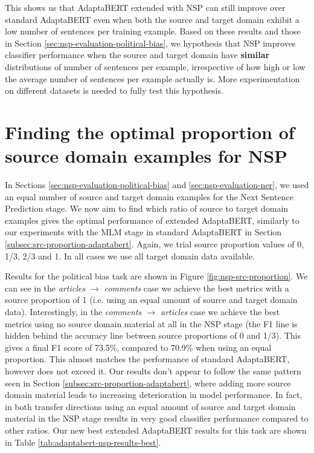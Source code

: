 This shows us that AdaptaBERT extended with NSP can still improve over standard AdaptaBERT even when both the source and target domain exhibit a low number of sentences per training example. Based on these results and those in Section \ref{sec:nsp-evaluation-political-bias}, we hypothesis that NSP improves classifier performance when the source and target domain have \textbf{similar} distributions of number of sentences per example, irrespective of how high or low the average number of sentences per example actually is. More experimentation on different datasets is needed to fully test this hypothesis.

\section{Finding the optimal proportion of source domain examples for NSP}

In Sections \ref{sec:nsp-evaluation-political-bias} and \ref{sec:nsp-evaluation-ner}, we used an equal number of source and target domain examples for the Next Sentence Prediction stage. We now aim to find which ratio of source to target domain examples gives the optimal performance of extended AdaptaBERT, similarly to our experiments with the MLM stage in standard AdaptaBERT in Section \ref{subsec:src-proportion-adaptabert}. Again, we trial source proportion values of 0, 1/3, 2/3 and 1. In all cases we use all target domain data available.

Results for the political bias task are shown in Figure \ref{fig:nsp-src-proportion}. We can see in the \textit{articles $ \rightarrow $ comments} case we achieve the best metrics with a source proportion of 1 (i.e. using an equal amount of source and target domain data). Interestingly, in the \textit{comments $ \rightarrow $ articles} case we achieve the best metrics using no source domain material at all in the NSP stage (the F1 line is hidden behind the accuracy line between source proportions of 0 and 1/3). This gives a final F1 score of 73.5\%, compared to 70.9\% when using an equal proportion. This almost matches the performance of standard AdaptaBERT, however does not exceed it. Our results don't appear to follow the same pattern seen in Section \ref{subsec:src-proportion-adaptabert}, where adding more source domain material leads to increasing deterioration in model performance. In fact, in both transfer directions using an equal amount of source and target domain material in the NSP stage results in very good classifier performance compared to other ratios. Our new best extended AdaptaBERT results for this task are shown in Table \ref{tab:adaptabert-nsp-results-best}. 

